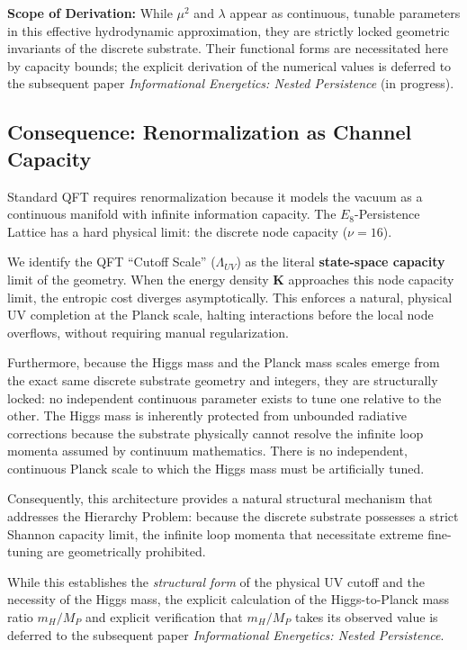 \textbf{Scope of Derivation:} While $\mu^2$ and $\lambda$ appear as continuous, tunable parameters in this effective hydrodynamic approximation, they are strictly locked geometric invariants of the discrete substrate. Their functional forms are necessitated here by capacity bounds; the explicit derivation of the numerical values is deferred to the subsequent paper \textit{Informational Energetics: Nested Persistence} (in progress).

\subsection{Consequence: Renormalization as Channel Capacity}
\label{subsec:uv_completion}

Standard QFT requires renormalization because it models the vacuum as a continuous manifold with infinite information capacity. The $E_8$-Persistence Lattice has a hard physical limit: the discrete node capacity ($\nu=16$).

We identify the QFT ``Cutoff Scale'' ($\Lambda_{UV}$) as the literal \textbf{state-space capacity} limit of the geometry. When the energy density $\mathbf{K}$ approaches this node capacity limit, the entropic cost diverges asymptotically. This enforces a natural, physical UV completion at the Planck scale, halting interactions before the local node overflows, without requiring manual regularization.

Furthermore, because the Higgs mass and the Planck mass scales emerge from the exact same discrete substrate geometry and integers, they are structurally locked: no independent continuous parameter exists to tune one relative to the other. The Higgs mass is inherently protected from unbounded radiative corrections because the substrate physically cannot resolve the infinite loop momenta assumed by continuum mathematics. There is no independent, continuous Planck scale to which the Higgs mass must be artificially tuned.

Consequently, this architecture provides a natural structural mechanism that addresses the Hierarchy Problem: because the discrete substrate possesses a strict Shannon capacity limit, the infinite loop momenta that necessitate extreme fine-tuning are geometrically prohibited.

While this establishes the \textit{structural form} of the physical UV cutoff and the necessity of the Higgs mass, the explicit calculation of the Higgs-to-Planck mass ratio $m_H/M_P$ and explicit verification that $m_H/M_P$ takes its observed value is deferred to the subsequent paper \textit{Informational Energetics: Nested Persistence}.